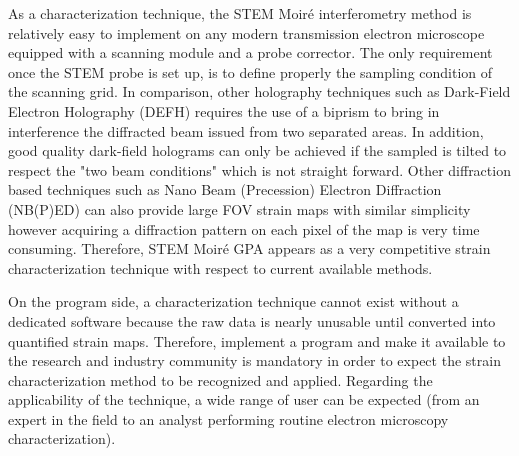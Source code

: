 \documentclass{article}
\begin{document}
As a characterization technique, the STEM Moir{\'e} interferometry method is relatively easy to implement on any modern transmission electron microscope equipped with a scanning module and a probe corrector. The only requirement once the STEM probe is set up, is to define properly the sampling condition of the scanning grid. In comparison, other holography techniques such as Dark-Field Electron Holography (DEFH) \cite{Hytch2008} requires the use of a biprism to bring in interference the diffracted beam issued from two separated areas. In addition, good quality dark-field holograms can only be achieved if the sampled is tilted to respect the "two beam conditions" which is not straight forward. Other diffraction based techniques such as Nano Beam (Precession) Electron Diffraction (NB(P)ED) \cite{Rouviere2013} can also provide large FOV strain maps with similar simplicity however acquiring a diffraction pattern on each pixel of the map is very time consuming. Therefore, STEM Moir{\'e} GPA appears as a very competitive strain characterization technique with respect to current available methods.\par \medskip
On the program side, a characterization technique cannot exist without a dedicated software because the raw data is nearly unusable until converted into quantified strain maps. Therefore, implement a program and make it available to the research and industry community is mandatory in order to expect the strain characterization method to be recognized and applied. Regarding the applicability of the technique, a wide range of user can be expected (from an expert in the field to an analyst performing routine electron microscopy characterization). 



\end{document}
